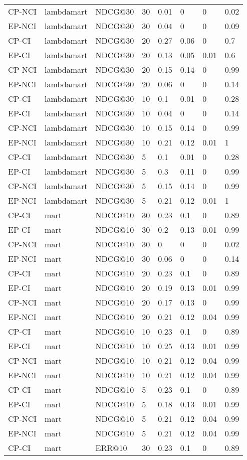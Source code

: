 \begin{landscape}
\begin{longtable}{|*{8}{l|}}
CP-NCI&lambdamart&NDCG@30&30&0.01&0&0&0.02\\
EP-NCI&lambdamart&NDCG@30&30&0.04&0&0&0.09\\
\hline
CP-CI&lambdamart&NDCG@30&20&0.27&0.06&0&0.7\\
EP-CI&lambdamart&NDCG@30&20&0.13&0.05&0.01&0.6\\
CP-NCI&lambdamart&NDCG@30&20&0.15&0.14&0&0.99\\
EP-NCI&lambdamart&NDCG@30&20&0.06&0&0&0.14\\
\hline
CP-CI&lambdamart&NDCG@30&10&0.1&0.01&0&0.28\\
EP-CI&lambdamart&NDCG@30&10&0.04&0&0&0.14\\
CP-NCI&lambdamart&NDCG@30&10&0.15&0.14&0&0.99\\
EP-NCI&lambdamart&NDCG@30&10&0.21&0.12&0.01&1\\
\hline
CP-CI&lambdamart&NDCG@30&5&0.1&0.01&0&0.28\\
EP-CI&lambdamart&NDCG@30&5&0.3&0.11&0&0.99\\
CP-NCI&lambdamart&NDCG@30&5&0.15&0.14&0&0.99\\
EP-NCI&lambdamart&NDCG@30&5&0.21&0.12&0.01&1\\
\hline
CP-CI&mart&NDCG@10&30&0.23&0.1&0&0.89\\
EP-CI&mart&NDCG@10&30&0.2&0.13&0.01&0.99\\
CP-NCI&mart&NDCG@10&30&0&0&0&0.02\\
EP-NCI&mart&NDCG@10&30&0.06&0&0&0.14\\
\hline
CP-CI&mart&NDCG@10&20&0.23&0.1&0&0.89\\
EP-CI&mart&NDCG@10&20&0.19&0.13&0.01&0.99\\
CP-NCI&mart&NDCG@10&20&0.17&0.13&0&0.99\\
EP-NCI&mart&NDCG@10&20&0.21&0.12&0.04&0.99\\
\hline
CP-CI&mart&NDCG@10&10&0.23&0.1&0&0.89\\
EP-CI&mart&NDCG@10&10&0.25&0.13&0.01&0.99\\
CP-NCI&mart&NDCG@10&10&0.21&0.12&0.04&0.99\\
EP-NCI&mart&NDCG@10&10&0.21&0.12&0.04&0.99\\
\hline
CP-CI&mart&NDCG@10&5&0.23&0.1&0&0.89\\
EP-CI&mart&NDCG@10&5&0.18&0.13&0.01&0.99\\
CP-NCI&mart&NDCG@10&5&0.21&0.12&0.04&0.99\\
EP-NCI&mart&NDCG@10&5&0.21&0.12&0.04&0.99\\
\hline
CP-CI&mart&ERR@10&30&0.23&0.1&0&0.89\\

\end{longtable}
\end{landscape}
